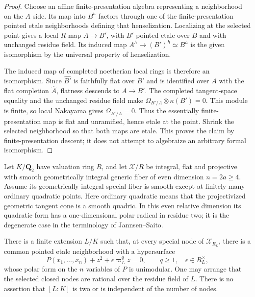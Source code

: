 \begin{proof}
Choose an affine finite-presentation algebra representing
a neighborhood on the $A$ side. Its map into $B^h$ factors
through one of the finite-presentation pointed etale
neighborhoods defining that henselization. Localizing at
the selected point gives a local $R$-map $A\to B'$, with
$B'$ pointed etale over $B$ and with unchanged residue
field. Its induced map $A^h\to(B')^h\simeq B^h$ is the
given isomorphism by the universal property of henselization.

The induced map of completed noetherian local rings is
therefore an isomorphism. Since $\widehat {B'}$ is
faithfully flat over $B'$ and is identified over $A$ with
the flat completion $\widehat A$, flatness descends to
$A\to B'$. The completed tangent-space equality and
the unchanged residue field make
$\Omega_{B'/A}\otimes\kappa(B')=0$. This module is
finite, so local Nakayama gives $\Omega_{B'/A}=0$.
Thus the essentially finite-presentation map is flat and
unramified, hence etale at the point. Shrink the selected
neighborhood so that both maps are etale. This proves the
claim by finite-presentation descent; it does not attempt
to algebraize an arbitrary formal isomorphism.
\end{proof}

Let $K/\mathbf Q_2$ have valuation ring $R$, and let
$\mathcal X/R$ be integral, flat and projective with
smooth geometrically integral generic fiber of even
dimension $n=2a\ge4$. Assume its geometrically integral
special fiber is smooth except at finitely many ordinary
quadratic points. Here ordinary quadratic means that
the projectivized geometric tangent cone is a smooth
quadric. In this even relative dimension its quadratic
form has a one-dimensional polar radical in residue two;
it is the degenerate case in the terminology of
Jannsen--Saito.

\begin{proposition}
\label{r17cd2:field}
There is a finite extension $L/K$ such that, at every
special node of $\mathcal X_{R_L}$, there is a common
pointed etale neighborhood with a hypersurface
\[
  P(x_1,\ldots,x_n)+z^2+\epsilon\varpi_L^qz=0,
       \qquad q\ge1,\quad \epsilon\in R_L^\times,
 \tag{CD217.1}\label{r17cd2:split-polynomial}
\]
whose polar form on the $n$ variables of $P$ is unimodular.
One may arrange that the selected closed nodes are rational
over the residue field of $L$. There is no assertion that
$[L:K]$ is two or is independent of the number of nodes.
\end{proposition}

